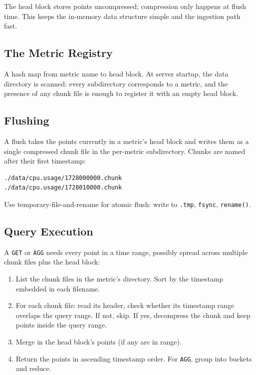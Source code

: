 \documentclass[11pt,a4paper]{article}
\begin{document}
The head block stores points uncompressed; compression only happens at flush time. This keeps the in-memory data structure simple and the ingestion path fast.

\subsection{The Metric Registry}
A hash map from metric name to head block. At server startup, the data directory is scanned: every subdirectory corresponds to a metric, and the presence of any chunk file is enough to register it with an empty head block.

\subsection{Flushing}
A flush takes the points currently in a metric's head block and writes them as a single compressed chunk file in the per-metric subdirectory. Chunks are named after their first timestamp:

\begin{codebox}
\begin{lstlisting}
./data/cpu.usage/1728000000.chunk
./data/cpu.usage/1728010000.chunk
\end{lstlisting}
\end{codebox}

Use temporary-file-and-rename for atomic flush: write to \texttt{.tmp}, \texttt{fsync}, \texttt{rename()}.

\subsection{Query Execution}
A \texttt{GET} or \texttt{AGG} needs every point in a time range, possibly spread across multiple chunk files plus the head block:

\begin{enumerate}
\item List the chunk files in the metric's directory. Sort by the timestamp embedded in each filename.
\item For each chunk file: read its header, check whether its timestamp range overlaps the query range. If not, skip. If yes, decompress the chunk and keep points inside the query range.
\item Merge in the head block's points (if any are in range).
\item Return the points in ascending timestamp order. For \texttt{AGG}, group into buckets and reduce.
\end{enumerate}
\end{document}
